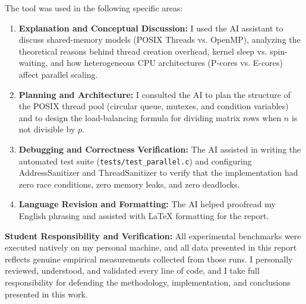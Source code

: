 \documentclass[11pt,a4paper]{article}
\begin{document}
The tool was used in the following specific areas:
\begin{enumerate}
    \item \textbf{Explanation and Conceptual Discussion:} I used the AI assistant to discuss shared-memory models (POSIX Threads vs. OpenMP), analyzing the theoretical reasons behind thread creation overhead, kernel sleep vs. spin-waiting, and how heterogeneous CPU architectures (P-cores vs. E-cores) affect parallel scaling.
    \item \textbf{Planning and Architecture:} I consulted the AI to plan the structure of the POSIX thread pool (circular queue, mutexes, and condition variables) and to design the load-balancing formula for dividing matrix rows when $n$ is not divisible by $p$.
    \item \textbf{Debugging and Correctness Verification:} The AI assisted in writing the automated test suite (\texttt{tests/test\_parallel.c}) and configuring AddressSanitizer and ThreadSanitizer to verify that the implementation had zero race conditions, zero memory leaks, and zero deadlocks.
    \item \textbf{Language Revision and Formatting:} The AI helped proofread my English phrasing and assisted with \LaTeX{} formatting for the report.
\end{enumerate}

\textbf{Student Responsibility and Verification:}
All experimental benchmarks were executed natively on my personal machine, and all data presented in this report reflects genuine empirical measurements collected from those runs. I personally reviewed, understood, and validated every line of code, and I take full responsibility for defending the methodology, implementation, and conclusions presented in this work.
\end{document}

